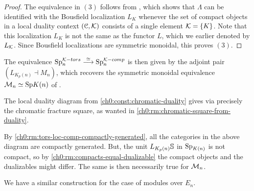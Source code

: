 \begin{proof}
    The equivalence in $(3)$ follows from \cite[2.34]{barthel-heard-valenzuela_2018}, which shows that $\Lambda$ can be identified with the Bousfield localization $L_K$ whenever the set of compact objects in a local duality context $(\C, \K)$ consists of a single element $\K=\{K\}$. Note that this localization $L_K$ is not the same as the functor $L$, which we earlier denoted by $L_\K$. Since Bousfield localizations are symmetric monoidal, this proves $(3)$. 
\end{proof}

\begin{remark}
    The equivalence $\sp\np^{\K-tors}\overset{\simeq}\longrightarrow \sp\np^{\K-comp}$ is then given by the adjoint pair $(L_{K_p(n)}\dashv M_n)$, which recovers the symmetric monoidal equivalence $\M\np \simeq \Sp\Kn$ of \cite[6.19]{hovey-strickland_99}. 
\end{remark}

\begin{remark}
    The local duality diagram from \cref{ch0:const:chromatic-duality} gives via \cite[2.26]{barthel-heard-valenzuela_2018} precisely the chromatic fracture square, as wanted in \cref{ch0:rm:chromatic-square-from-duality}.   
\end{remark}

\begin{remark}
    By \cref{ch0:rm:tors-loc-comp-compactly-generated}, all the categories in the above diagram are compactly generated. But, the unit $L_{K_p(n)}\S$ in $\SpK$ is not compact, so by \cref{ch0:rm:compacts-equal-dualizable} the compact objects and the dualizables might differ. The same is then necessarily true for $\M\np$.
\end{remark}

We have a similar construction for the case of modules over $E_n$. 

